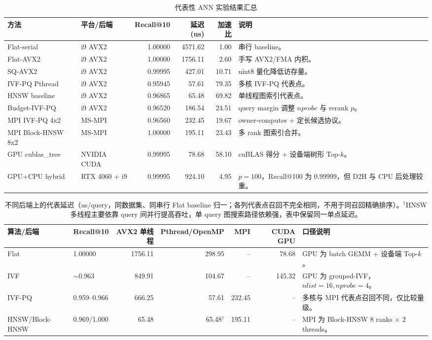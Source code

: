 \documentclass[a4paper,11pt,UTF8]{ctexart}
\begin{document}
\begin{table}[H]
  \centering\footnotesize
  \begin{tabularx}{\textwidth}{p{3.0cm}p{2.8cm}r r r Y}
    \toprule
    方法 & 平台/后端 & Recall@10 & 延迟(us) & 加速比 & 说明 \\
    \midrule
    Flat-serial & i9 AVX2 & 1.00000 & 4571.62 & 1.00 & 串行 baseline。 \\
    Flat-AVX2 & i9 AVX2 & 1.00000 & 1756.11 & 2.60 & 手写 AVX2/FMA 内积。 \\
    SQ-AVX2 & i9 AVX2 & 0.99995 & 427.01 & 10.71 & uint8 量化降低访存量。 \\
    IVF-PQ Pthread & i9 AVX2 & 0.95945 & 57.61 & 79.35 & 多核 IVF-PQ 代表点。 \\
    HNSW baseline & i9 AVX2 & 0.96865 & 65.48 & 69.82 & 单线程图索引代表点。 \\
    Budget-IVF-PQ & i9 AVX2 & 0.96520 & 186.54 & 24.51 & query margin 调整 $nprobe$ 与 rerank $p$。 \\
    MPI IVF-PQ 4x2 & MS-MPI & 0.96560 & 232.45 & 19.67 & owner-computes + 定长候选协议。 \\
    MPI Block-HNSW 8x2 & MS-MPI & 1.00000 & 195.11 & 23.43 & 多 rank 图索引合并。 \\
    GPU cublas\_tree & NVIDIA CUDA & 0.99995 & 78.68 & 58.10 & cuBLAS 得分 + 设备端树形 Top-$k$。 \\
    GPU+CPU hybrid & RTX 4060 + i9 & 0.99995 & 924.10 & 4.95 & $p=100$，Recall@100 为 0.99999，但 D2H 与 CPU 后处理较重。 \\
    \bottomrule
  \end{tabularx}
  \caption{代表性 ANN 实验结果汇总}
  \label{tab:summary-results}
\end{table}

\begin{table}[H]
  \centering\footnotesize
  \begin{tabularx}{\textwidth}{p{2.3cm}p{2.0cm}rrrrY}
    \toprule
    算法/后端 & Recall@10 & AVX2 单线程 & Pthread/OpenMP & MPI & CUDA GPU & 口径说明 \\
    \midrule
    Flat & 1.00000 & 1756.11 & 298.95 & -- & 78.68 & GPU 为 batch GEMM + 设备端 Top-$k$。 \\
    IVF & $\sim$0.963 & 849.91 & 104.67 & -- & 145.32 & GPU 为 grouped-IVF，$nlist=16,nprobe=4$。 \\
    IVF-PQ & 0.959--0.966 & 666.25 & 57.61 & 232.45 & -- & 多核与 MPI 代表点召回不同，仅比较量级。 \\
    HNSW/Block-HNSW & 0.969/1.000 & 65.48 & 65.48$^\dagger$ & 195.11 & -- & MPI 为 Block-HNSW 8 ranks $\times$ 2 threads。 \\
    \bottomrule
  \end{tabularx}
  \caption{不同后端上的代表延迟（us/query，同数据集、同串行 Flat baseline 归一；各列代表点召回不完全相同，不用于同召回精确排序）。$^\dagger$HNSW 多线程主要依靠 query 间并行提高吞吐，单 query 图搜索路径依赖强，表中保留同一单点延迟。}
  \label{tab:arch-algo-matrix}
\end{table}
\end{document}
